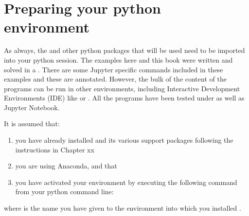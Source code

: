 \documentclass[letterpaper,10pt,english]{jupyterBook}
\begin{document}
\chapter{Preparing your python environment}
\label{\detokenize{content/06_WBModels/LoadingWBModel:preparing-your-python-environment}}
\sphinxAtStartPar
As always, the  and other python packages that will be used need to be imported into your python session.  The examples here and this book were written and solved in a . There are some Jupyter specific commands included in these examples and these are annotated. However, the bulk of the content of the programs can be run in other environments, including Interactive Development Environments (IDE) like or .  All the programs have been tested under  as well as Jupyter Notebook.

\sphinxAtStartPar
It is assumed that:
\begin{enumerate}
%
\item {} 
\sphinxAtStartPar
you have already installed  and its various support packages following the instructions in Chapter xx

\item {} 
\sphinxAtStartPar
you are using Anaconda, and that

\item {} 
\sphinxAtStartPar
you have activated your  environment by executing the following command from your python command line:

\end{enumerate}

\begin{sphinxVerbatim}[commandchars=\\\{\}]
  
\end{sphinxVerbatim}

\sphinxAtStartPar
where  is the name you have given to the  environment into which you installed .
\end{document}

